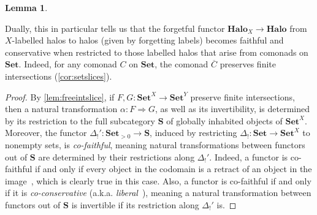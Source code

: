 \documentclass[11pt, oneside, article]{memoir}
\theoremstyle{plain}
\newtheorem{lemma}[theorem]{Lemma}
\theoremstyle{definition}
\theoremstyle{remark}
\DeclarePairedDelimiter{\abs}{\lvert}{\rvert}
\newcommand{\bang}{\mathrm{!}}
\newcommand{\namedcat}[1]{\mathbf{#1}}
\newcommand{\Halo}{\namedcat{Halo}}
\newcommand{\Set}{\namedcat{Set}}
\newcommand{\clift}[1]{\overline{#1}}
\newcommand{\pts}[1]{{\abs{#1}}}
\newcommand{\one}[1]{\pts{#1}}
\newcommand{\reindex}[1]{\Delta_{#1}}
\newcommand{\slicer}{\Delta_\bang}
\newcommand{\cmnd}[1]{{#1}}
\newcommand{\xX}{X}
\newcommand{\cA}{\cmnd{A}}
\newcommand{\cB}{\cmnd{B}}
\newcommand{\cC}{\cmnd{C}}
\newcommand{\cD}{\cmnd{D}}
\newcommand{\sS}{\namedcat{S}}
\newcommand{\SetpB}{\Set^\pts{\cB}}
\newcommand{\SetpC}{\Set^\pts{\cC}}
\newcommand{\SetpD}{\Set^\pts{\cD}}
\begin{document}
\begin{lemma}
\end{lemma}

Dually, this in particular tells us that the forgetful functor
$\Halo_X \to \Halo$ from $X$-labelled halos to halos (given by
forgetting labels) becomes faithful and conservative when restricted
to those labelled halos that arise from comonads on $\Set$. Indeed,
for any comonad $\cC$ on $\Set$, the comonad $\clift{\cC}$ preserves
finite intersections (\cref{cor:setslices}).

\begin{proof}
  By \cref{lem:freeintslice}, if $F, G \colon \Set^\xX \to \Set^Y$
  preserve finite intersections, then a natural transformation
  $\alpha \colon F \Rightarrow G$, as well as its invertibility, is
  determined by its restriction to the full subcategory $\sS$ of
  globally inhabited objects of $\Set^\xX$. Moreover, the functor
  $\slicer' \colon \Set_{>0} \to \sS$, induced by restricting
  $\slicer \colon \Set \to \Set^\xX$ to nonempty sets, is
  \emph{co-faithful}, meaning natural transformations between functors
  out of $\sS$ are determined by their restrictions along
  $\slicer'$. Indeed, a functor is co-faithful if and only if every
  object in the codomain is a retract of an object in the
  image~\cite[Proposition
  3.1]{carboni-johnson-street-verity}\cite[Proposition
  4.1]{adamek-elbashir-sobral-velebil}, which is clearly true in this
  case. Also, a functor is co-faithful if and only if it is
  \emph{co-conservative} (a.k.a. \emph{liberal}~\cite[Definition
  2.2]{carboni-johnson-street-verity}), meaning a natural transformation
  between functors out of $\sS$ is invertible if its restriction along
  $\slicer'$ is.
\end{proof}
\end{document}
